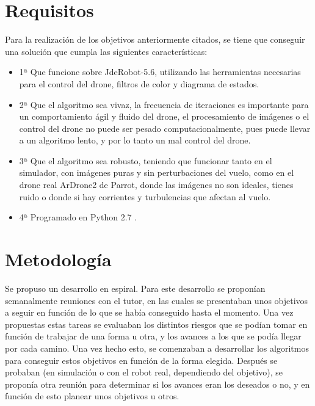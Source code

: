 \section{Requisitos}
\hspace{1 cm} Para la realizaci\'on de los objetivos anteriormente citados, se tiene que conseguir una soluci\'on que cumpla las siguientes caracter\'isticas:
\begin{itemize}
\item 1ª Que funcione sobre JdeRobot-5.6, utilizando las herramientas necesarias para el control del drone, filtros de color y diagrama de estados. 
\item 2ª Que el algoritmo sea vivaz, la frecuencia de iteraciones es importante para un comportamiento \'agil y fluido del drone, el procesamiento de im\'agenes o el control del drone no puede ser pesado computacionalmente, pues puede llevar a un algoritmo lento, y por lo tanto un mal control del drone. 
\item 3ª Que el algoritmo sea robusto, teniendo que funcionar tanto en el simulador, con im\'agenes puras y sin perturbaciones del vuelo, como en el drone real ArDrone2 de Parrot, donde las im\'agenes no son ideales, tienes ruido o donde si hay corrientes y turbulencias que afectan al vuelo.
\item 4ª Programado en Python 2.7 . 
\end{itemize}

\section{Metodolog\'ia}

\hspace{1 cm}Se propuso un desarrollo en espiral. Para este desarrollo se propon\'ian semanalmente reuniones con el tutor, en las cuales se presentaban unos objetivos a seguir en funci\'on de lo que se hab\'ia conseguido hasta el momento. Una vez propuestas estas tareas se evaluaban los distintos riesgos que se pod\'ian tomar en funci\'on de trabajar de una forma u otra, y los avances a los que se pod\'ia llegar por cada camino. Una vez hecho esto, se comenzaban a desarrollar los algoritmos para conseguir estos objetivos en funci\'on de la forma elegida. Despu\'es se probaban (en simulaci\'on o con el robot real, dependiendo del objetivo), se propon\'ia otra reuni\'on para determinar si los avances eran los deseados o no, y en funci\'on de esto planear unos objetivos u otros.  


